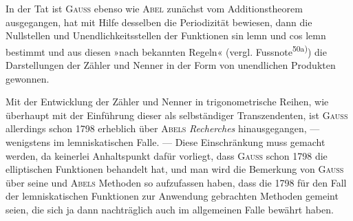 In der Tat ist \textsc{Gauss} ebenso wie \textsc{Abel} zunächst vom Additionstheorem
ausgegangen, hat mit Hilfe desselben die Periodizität bewiesen, dann die Nullstellen
und Unendlichkeitsstellen der Funktionen sin lemn und cos lemn bestimmt
und aus diesen »nach bekannten Regeln« (vergl. Fussnote\textsuperscript{50a)}) die Darstellungen
der Zähler und Nenner in der Form von unendlichen Produkten
gewonnen.

Mit der Entwicklung der Zähler und Nenner in trigonometrische Reihen,
wie überhaupt mit der Einführung dieser als selbständiger Transzendenten, ist
\textsc{Gauss} allerdings schon 1798 erheblich über \textsc{Abels} \textit{Recherches} hinausgegangen,
— wenigstens im lemniskatischen Falle. — Diese Einschränkung muss gemacht
werden, da keinerlei Anhaltspunkt dafür vorliegt, dass \textsc{Gauss} schon
1798 die  elliptischen Funktionen behandelt hat, und man wird
die Bemerkung von \textsc{Gauss} über seine und \textsc{Abels} Methoden so aufzufassen
haben, dass die 1798 für den Fall der lemniskatischen Funktionen zur Anwendung
gebrachten Methoden gemeint seien, die sich ja dann nachträglich
auch im allgemeinen Falle bewährt haben.
